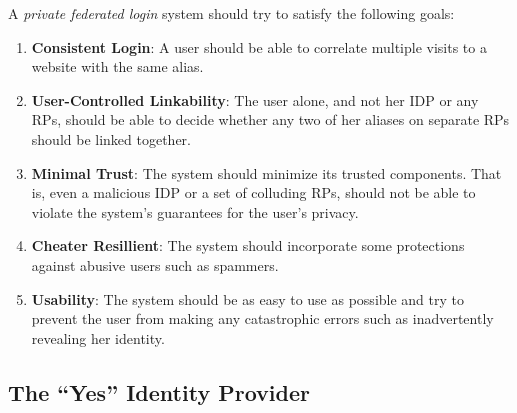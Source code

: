 \documentclass{llncs}
\begin{document}
\begin{definition}
\label{def:abuse}
\end{definition}




A \emph{private federated login} system should try to satisfy the following
goals:

\begin{enumerate}
  \item \textbf{Consistent Login}: A user should be able to correlate multiple
  visits to a website with the same alias.
  \item \textbf{User-Controlled Linkability}: The user alone, and not her IDP or
  any RPs, should be able to decide whether any two of her aliases on separate
  RPs should be linked together.
  \item \textbf{Minimal Trust}: The system should minimize its trusted
  components. That is, even a malicious IDP or a set of colluding RPs, should
  not be able to violate the system's guarantees for the user's privacy.
  \item \textbf{Cheater Resillient}: The system should incorporate some
  protections against abusive users such as spammers.
  \item \textbf{Usability}: The system should be as easy to use as possible and
  try to prevent the user from making any catastrophic errors such as
  inadvertently revealing her identity.
\end{enumerate}


\subsection{The ``Yes'' Identity Provider}
\end{document}

